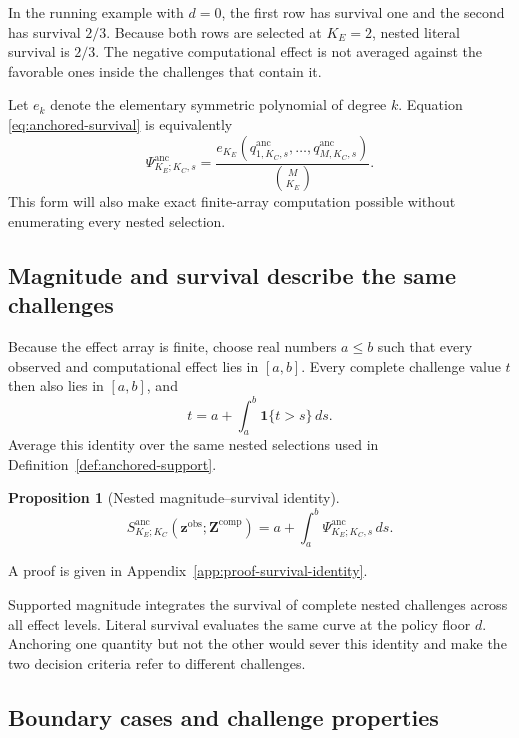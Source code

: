\documentclass[11pt]{article}
\newcommand{\Sanc}{S^{\mathrm{anc}}}
\newcommand{\Psianc}{\Psi^{\mathrm{anc}}}
\newtheorem{proposition}{Proposition}
\theoremstyle{remark}
\begin{document}
In the running example with $d=0$, the first row has survival one and the
second has survival $2/3$. Because both rows are selected at $K_E=2$, nested
literal survival is $2/3$. The negative computational effect is not averaged
against the favorable ones inside the challenges that contain it.

Let $e_k$ denote the elementary symmetric polynomial of degree $k$. Equation
\eqref{eq:anchored-survival} is equivalently
\begin{equation}
\Psianc_{K_E;K_C,s}
=
\frac{e_{K_E}\left(
q^{\mathrm{anc}}_{1,K_C,s},\ldots,
q^{\mathrm{anc}}_{M,K_C,s}
\right)}{\binom{M}{K_E}}.
\label{eq:elementary-symmetric}
\end{equation}
This form will also make exact finite-array computation possible without
enumerating every nested selection.

\subsection{Magnitude and survival describe the same challenges}

Because the effect array is finite, choose real numbers $a\leq b$ such that
every observed and computational effect lies in $[a,b]$. Every complete
challenge value $t$ then also lies in $[a,b]$, and
\[
t=a+\int_a^b\mathbf 1\{t>s\}\,ds.
\]
Average this identity over the same nested selections used in
Definition~\ref{def:anchored-support}.

\begin{proposition}[Nested magnitude--survival identity]
\label{prop:survival-identity}
\begin{equation}
\Sanc_{K_E;K_C}
\left(\mathbf z^{\mathrm{obs}};\mathbf Z^{\mathrm{comp}}\right)
=
a+
\int_a^b
\Psianc_{K_E;K_C,s}\,ds.
\label{eq:nested-survival-identity}
\end{equation}
\end{proposition}

A proof is given in Appendix~\ref{app:proof-survival-identity}.

Supported magnitude integrates the survival of complete nested challenges
across all effect levels. Literal survival evaluates the same curve at the
policy floor $d$. Anchoring one quantity but not the other would sever this
identity and make the two decision criteria refer to different challenges.

\subsection{Boundary cases and challenge properties}
\label{sec:properties}
\end{document}
